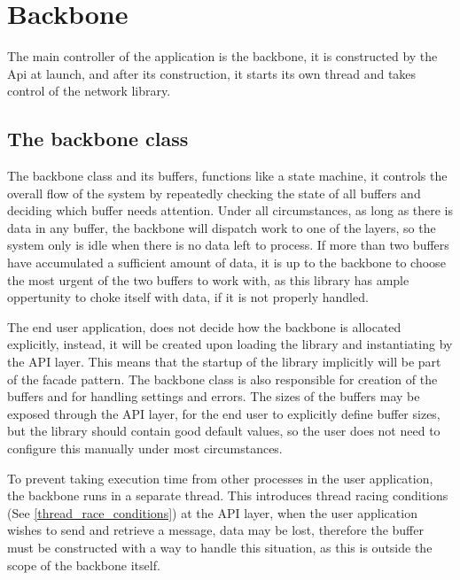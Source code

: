 \chapter{Backbone}\label{chap:backbone}
The main controller of the application is the backbone, it is constructed by the Api at launch, and after its construction, it starts its own thread and takes control of the network library.

\section{The backbone class}
The backbone class and its buffers, functions like a state machine, it controls the overall flow of the system by repeatedly checking the state of all buffers and deciding which buffer needs attention. Under all circumstances, as long as there is data in any buffer, the backbone will dispatch work to one of the layers, so the system only is idle when there is no data left to process.
If more than two buffers have accumulated a sufficient amount of data, it is up to the backbone to choose the most urgent of the two buffers to work with, as this library has ample oppertunity to choke itself with data, if it is not properly handled.

The end user application, does not decide how the backbone is allocated explicitly, instead, it will be created upon loading the library and instantiating by the API layer. This means that the startup of the library implicitly will be part of the facade pattern.
The backbone class is also responsible for creation of the buffers and for handling settings and errors. The sizes of the buffers may be exposed through the API layer, for the end user to explicitly define buffer sizes, but the library should contain good default values, so the user does not need to configure this manually under most circumstances.

To prevent taking execution time from other processes in the user application, the backbone runs in a separate thread. This introduces thread racing conditions  (See \ref{thread_race_conditions}) at the API layer, when the user application wishes to send and retrieve a message, data may be lost, therefore the buffer must be constructed with a way to handle this situation, as this is outside the scope of the backbone itself.

